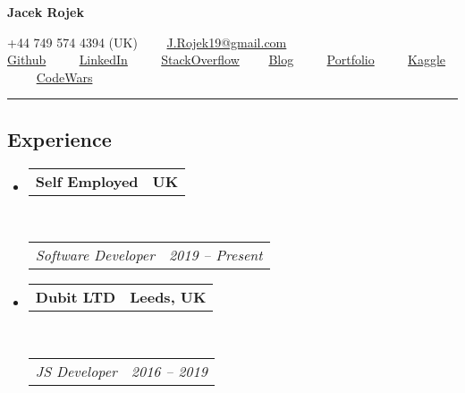 \documentclass[10pt,letterpaper]{article}
\makeatletter
\newcommand{\headerrow}[2]
{\begin{tabular*}{\linewidth}{l@{\extracolsep{\fill}}r}
	#1 &
	#2 \\
\end{tabular*}}
\makeatother
\begin{document}
\begin{center}
{\LARGE \textbf{Jacek Rojek}}
\end{center}
\begin{center}
+44 749 574 4394 (UK)\ \ \textbullet
\ \ \href{mailto:j.rojek19@gmail.com}{J.Rojek19@gmail.com}
\\
\href{https://github.com/JacekRojek}{Github} \ \ \textbullet
\ \ \href{https://www.linkedin.com/in/jacek-rojek-b7a396105/}{LinkedIn} \ \ \textbullet
\ \ \href{https://stackoverflow.com/users/4375103/jacek-rojek}{StackOverflow}\ \ \textbullet
\ \ \href{https://indiedevart.wordpress.com/}{Blog} \ \ \textbullet
\ \ \href{https://jacekrojek.github.io/JacekRojek-Portfolio/}{Portfolio} \ \ \textbullet
\ \ \href{https://www.kaggle.com/jacek123}{Kaggle} \ \ \textbullet
\ \ \href{https://www.codewars.com/users/JacekRojek}{CodeWars}

\end{center}

\hrule
\vspace{-0.4em}
\subsection*{Experience}

\begin{itemize}
	\parskip=0.1em

  \item
	\headerrow
		{\textbf{Self Employed}}
		{\textbf{UK}}
	\\
	\headerrow
		{\emph{Software Developer}}
		{\emph{2019 -- Present}}

	\item
	\headerrow
		{\textbf{Dubit LTD}}
		{\textbf{Leeds, UK}}
	\\
	\headerrow
		{\emph{JS Developer}}
		{\emph{2016 -- 2019}}
\end{itemize}
\end{document}
